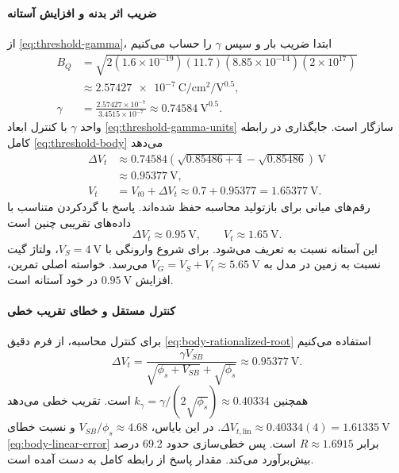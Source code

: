 \paragraph*{ضریب اثر بدنه و افزایش آستانه}
از \eqref{eq:threshold-gamma}، ابتدا ضریب بار و سپس \(\gamma\) را
حساب می‌کنیم
\begin{align*}
 B_Q&=\sqrt{2(1.6\times10^{-19})(11.7)(8.85\times10^{-14})(2\times10^{17})}
 \\
 &\approx\qty{2.57427e-7}{\coulomb\per\centi\metre\squared\per\volt\tothe{0.5}},\\
 \gamma&=\frac{2.57427\times10^{-7}}{3.4515\times10^{-7}}
 \approx\qty{0.74584}{\volt\tothe{0.5}}.
\end{align*}
واحد \(\gamma\) با کنترل ابعاد
\eqref{eq:threshold-gamma-units} سازگار است. جایگذاری در رابطه
کامل \eqref{eq:threshold-body} می‌دهد
\begin{align*}
 \Delta V_t&\approx0.74584
 \left(\sqrt{0.85486+4}-\sqrt{0.85486}\right)\,\unit{\volt}\\
 &\approx\qty{0.95377}{\volt},\\
 V_t&=V_{t0}+\Delta V_t\approx0.7+0.95377
 =\qty{1.65377}{\volt}.
\end{align*}
رقم‌های میانی برای بازتولید محاسبه حفظ شده‌اند. پاسخ با گردکردن
متناسب با داده‌های تقریبی چنین است
\begin{equation*}
 \boxed{\Delta V_t\approx\qty{0.95}{\volt},\qquad
 V_t\approx\qty{1.65}{\volt}}.
\end{equation*}
این آستانه نسبت به  تعریف می‌شود. برای شروع وارونگی با
\(V_S=\qty{4}{\volt}\)، ولتاژ گیت نسبت به زمین در مدل به
\(V_G=V_S+V_t\approx\qty{5.65}{\volt}\) می‌رسد.
خواسته اصلی تمرین، افزایش \(\qty{0.95}{\volt}\) در خود آستانه است.

\paragraph*{کنترل مستقل و خطای تقریب خطی}
برای کنترل محاسبه، از فرم دقیق
\eqref{eq:body-rationalized-root} استفاده می‌کنیم
\begin{equation*}
 \Delta V_t=\frac{\gamma V_{SB}}
 {\sqrt{\phi_s+V_{SB}}+\sqrt{\phi_s}}
 \approx\qty{0.95377}{\volt}.
\end{equation*}
همچنین \(k_\gamma=\gamma/(2\sqrt{\phi_s})\approx0.40334\) است.
تقریب خطی می‌دهد
\(\Delta V_{t,\mathrm{lin}}\approx0.40334(4)
=\qty{1.61335}{\volt}\).
در این بایاس، \(V_{SB}/\phi_s\approx4.68\) و نسبت خطای
\eqref{eq:body-linear-error} برابر
\(R\approx1.6915\) است. پس خطی‌سازی حدود \num{69.2} درصد
بیش‌برآورد می‌کند. مقدار پاسخ از رابطه کامل به دست آمده است.

